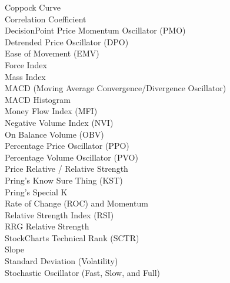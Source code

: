 \documentclass[12pt,a4paper]{article}
\begin{document}
Coppock Curve \\

Correlation Coefficient \\

DecisionPoint Price Momentum Oscillator (PMO) \\

Detrended Price Oscillator (DPO) \\

Ease of Movement (EMV) \\

Force Index \\

Mass Index \\

MACD (Moving Average Convergence/Divergence Oscillator) \\

MACD Histogram \\

Money Flow Index (MFI) \\

Negative Volume Index (NVI) \\

On Balance Volume (OBV) \\

Percentage Price Oscillator (PPO) \\

Percentage Volume Oscillator (PVO) \\

Price Relative / Relative Strength \\

Pring's Know Sure Thing (KST) \\

Pring's Special K \\

Rate of Change (ROC) and Momentum \\

Relative Strength Index (RSI) \\

RRG Relative Strength \\

StockCharts Technical Rank (SCTR) \\

Slope \\

Standard Deviation (Volatility) \\

Stochastic Oscillator (Fast, Slow, and Full) \\
\end{document}
